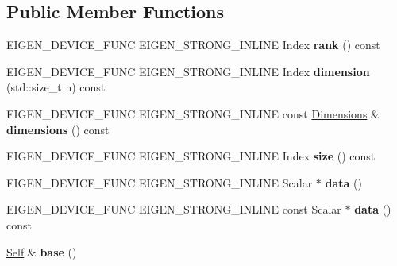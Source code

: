 \subsection*{Public Member Functions}
\begin{DoxyCompactItemize}
\item 
\mbox{\label{class_eigen_1_1_tensor_af3ae187be5d5419f416348fd59287bc3}} 
E\+I\+G\+E\+N\+\_\+\+D\+E\+V\+I\+C\+E\+\_\+\+F\+U\+NC E\+I\+G\+E\+N\+\_\+\+S\+T\+R\+O\+N\+G\+\_\+\+I\+N\+L\+I\+NE Index {\bfseries rank} () const
\item 
\mbox{\label{class_eigen_1_1_tensor_ac0a1bb6142d4e5c4d15ba25beccb26a5}} 
E\+I\+G\+E\+N\+\_\+\+D\+E\+V\+I\+C\+E\+\_\+\+F\+U\+NC E\+I\+G\+E\+N\+\_\+\+S\+T\+R\+O\+N\+G\+\_\+\+I\+N\+L\+I\+NE Index {\bfseries dimension} (std\+::size\+\_\+t n) const
\item 
\mbox{\label{class_eigen_1_1_tensor_a2aae1ea69ec73eab862d4534ee00dac6}} 
E\+I\+G\+E\+N\+\_\+\+D\+E\+V\+I\+C\+E\+\_\+\+F\+U\+NC E\+I\+G\+E\+N\+\_\+\+S\+T\+R\+O\+N\+G\+\_\+\+I\+N\+L\+I\+NE const \hyperlink{struct_eigen_1_1_d_sizes}{Dimensions} \& {\bfseries dimensions} () const
\item 
\mbox{\label{class_eigen_1_1_tensor_a890988b2e1dd992d9b905e0a6a488587}} 
E\+I\+G\+E\+N\+\_\+\+D\+E\+V\+I\+C\+E\+\_\+\+F\+U\+NC E\+I\+G\+E\+N\+\_\+\+S\+T\+R\+O\+N\+G\+\_\+\+I\+N\+L\+I\+NE Index {\bfseries size} () const
\item 
\mbox{\label{class_eigen_1_1_tensor_ae09663818399750cf150181aaed47b99}} 
E\+I\+G\+E\+N\+\_\+\+D\+E\+V\+I\+C\+E\+\_\+\+F\+U\+NC E\+I\+G\+E\+N\+\_\+\+S\+T\+R\+O\+N\+G\+\_\+\+I\+N\+L\+I\+NE Scalar $\ast$ {\bfseries data} ()
\item 
\mbox{\label{class_eigen_1_1_tensor_a1388805b72e27eef98efcb3192707ad1}} 
E\+I\+G\+E\+N\+\_\+\+D\+E\+V\+I\+C\+E\+\_\+\+F\+U\+NC E\+I\+G\+E\+N\+\_\+\+S\+T\+R\+O\+N\+G\+\_\+\+I\+N\+L\+I\+NE const Scalar $\ast$ {\bfseries data} () const
\item 
\mbox{\label{class_eigen_1_1_tensor_a49013cff6ae8eb8ac7c3dc602fe5293c}} 
\hyperlink{class_eigen_1_1_tensor}{Self} \& {\bfseries base} ()

\end{DoxyCompactItemize}
